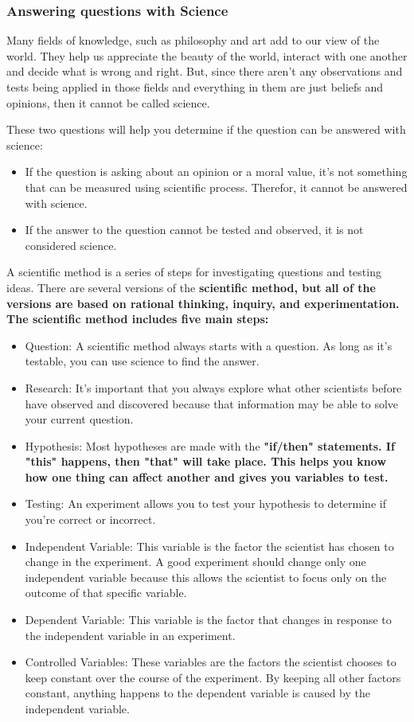 \subsubsection*{Answering questions with Science}

Many fields of knowledge, such as philosophy and art add to our view of the world. They help us appreciate the beauty of the world, interact with one another and decide what is wrong and right. But, since there aren't any observations and tests being applied in those fields and everything in them are just beliefs and opinions, then it cannot be called science.

These two questions will help you determine if the question can be answered with science:

\begin{itemize}
    \item If the question is asking about an opinion or a moral value, it's not something that can be measured using scientific process. Therefor, it cannot be answered with science.
	\item If the answer to the question cannot be tested and observed, it is not considered science.
\end{itemize}

A scientific method is a series of steps for investigating questions and testing ideas. There are several versions of the \bf{scientific method}, but all of the versions are based on rational thinking, inquiry, and experimentation. The \bf{scientific method} includes five main steps:

\begin{itemize}
	\item Question: A scientific method always starts with a question. As long as it's testable, you can use science to find the answer.
	\item Research: It's important that you always explore what other scientists before have observed and discovered because that information may be able to solve your current question.
	\item Hypothesis: Most hypotheses are made with the \bf{"if/then"} statements. If "this" happens, then "that" will take place. This helps you know how one thing can affect another and gives you variables to test.
	\item Testing: An experiment allows you to test your hypothesis to determine if you're correct or incorrect.
		\item Independent Variable: This variable is the factor the scientist has chosen to change in the experiment. A good experiment should change only one independent variable because this allows the scientist to focus only on the outcome of that specific variable.
		\item Dependent Variable: This variable is the factor that changes in response to the independent variable in an experiment.
		\item Controlled Variables: These variables are the factors the scientist chooses to keep constant over the course of the experiment. By keeping all other factors constant, anything happens to the dependent variable is caused by the independent variable.
\end{itemize}

\newpage
